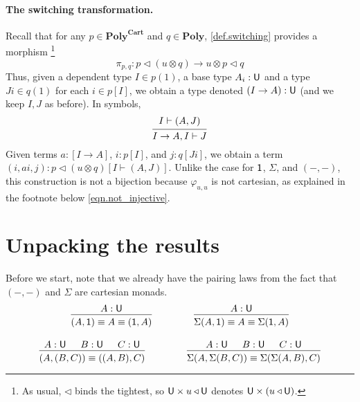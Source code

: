 \documentclass[11pt, one side, article]{memoir}
\theoremstyle{definition}
\theoremstyle{plain}
\newcommand{\Cat}[1]{\mathbf{#1}}%
\newcommand{\tn}[1]{\textnormal{#1}}
\newcommand{\poly}{\Cat{Poly}}
\newcommand{\polycart}{\poly^{\Cat{Cart}}}
\newcommand{\0}{\textsf{0}}
\newcommand{\1}{\tn{\textsf{1}}}
\newcommand{\U}{\tn{\textsf{U}}}
\newcommand{\tri}{\mathbin{\triangleleft}}
\newcommand{\switch}{\pi}
\begin{document}
\paragraph{The switching transformation.}

Recall that for any $p\in\polycart$ and $q\in\poly$, \cref{def.switching} provides a morphism%
\footnote{As usual, $\tri$ binds the tightest, so $\U\times u\tri \U$ denotes $\U\times(u\tri \U)$.}
\[\switch_{p,q}\colon p\tri (u\otimes q)\to u\otimes p\tri q\]
Thus, given a dependent type $I\in p(1)$, a base type $A_i:\U$ and a type $J i\in q(1)$ for each $i\in p[I]$, we obtain a type denoted $(I\to A):\U$ (and we keep $I,J$ as before). In symbols,
\begin{equation*}
  \begin{prooftree}
    \Hypo{I\vdash (A, J)}
    \Infer1{I\to A, I\vdash J}
  \end{prooftree}
\end{equation*}
Given terms $a:[I\to A]$, $i:p[I]$, and $j:q[Ji]$, we obtain a term $(i,a i, j):p\tri(u\otimes q)[I\vdash (A,J)]$. Unlike the case for $\1$, $\Sigma$, and $(-,-)$, this construction is not a bijection because $\varphi_{u,u}$ is not cartesian, as explained in the footnote below \cref{eqn.not_injective}.

\section{Unpacking the results}


Before we start, note that we already have the pairing laws from the fact that $(-,-)$ and $\Sigma$ are cartesian monads.
\begin{gather*}
\begin{prooftree}
	\Hypo{A:\U}
	\Infer1{(A,\1)\equiv A\equiv (\1,A)}
\end{prooftree}
\hspace{.6in}
\begin{prooftree}
	\Hypo{A:\U}
	\Infer1{\Sigma(A,\1)\equiv A\equiv \Sigma(\1,A)}
\end{prooftree}
\\[10pt]
\begin{prooftree}
	\Hypo{A:\U}
	\Hypo{B:\U}
	\Hypo{C:\U}
	\Infer3{(A,(B,C))\equiv ((A,B),C)}
\end{prooftree}
\hspace{.6in}
\begin{prooftree}
	\Hypo{A:\U}
	\Hypo{B:\U}
	\Hypo{C:\U}
	\Infer3{\Sigma(A,\Sigma(B,C))\equiv \Sigma(\Sigma(A,B),C)}
\end{prooftree}
\end{gather*}
\end{document}
